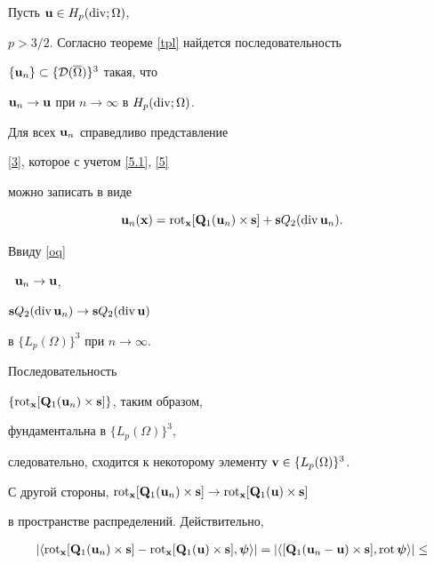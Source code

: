 \begin{pf}


Пусть $\bold{u}\in H_p(\operatorname{div};\Omega)$,


$p>3/2$. Согласно теореме \ref{tpl} найдется последовательность


$\{\bold{u}_n\}\subset\{{\cal D}(\overline{\Omega})\}^3$ такая, что


$\bold{u}_n\to\bold{u}$ при $n\to\infty$ в $H_p(\operatorname{div};\Omega)$.


Для всех $\bold{u}_n$ справедливо представление


\eqref{3}, которое с учетом \eqref{5.1}, \eqref{5}


можно записать в виде


\begin{equation}


\bold{u}_n(\bold{x})=\Rot_{\bold{x}}[\bold{Q}_1(\bold{u}_n)\times\bold{s}]+


\bold{s}Q_2(\Div\bold{u}_n).


\label{b1}


\end{equation}


Ввиду \eqref{oq}


\ $\bold{u}_n\to\bold{u}$,


$\bold{s}Q_2(\operatorname{div}\bold{u}_n)\to\bold{s}Q_2(\operatorname{div}\bold{u})$


в $\{L_p(\Omega)\}^3$ при $n\to\infty$.





Последовательность


$\{\operatorname{rot}_{\bold{x}}[\bold{Q}_1(\bold{u}_n)\times\bold{s}]\}$, таким образом,


фундаментальна в $\{L_p(\Omega)\}^3$,


следовательно, сходится к некоторому элементу $\bold{v}\in\{L_p(\Omega)\}^3$.


С другой стороны, $\Rot_{\bold{x}}[\bold{Q}_1(\bold{u}_n)\times\bold{s}]


\to\Rot_{\bold{x}}[\bold{Q}_1(\bold{u})\times\bold{s}]$


в пространстве распределений. Действительно,


\begin{multline*}


|\la \Rot_{\bold{x}}[\bold{Q}_1(\bold{u}_n)\times\bold{s}]


-\Rot_{\bold{x}}[\bold{Q}_1(\bold{u})\times\bold{s}],\boldsymbol{\psi}\ra|=


|\la[\bold{Q}_1(\bold{u}_n-\bold{u})\times\bold{s}],\Rot\boldsymbol{\psi}\ra|\leq \\



\end{multline*}
\end{pf}
